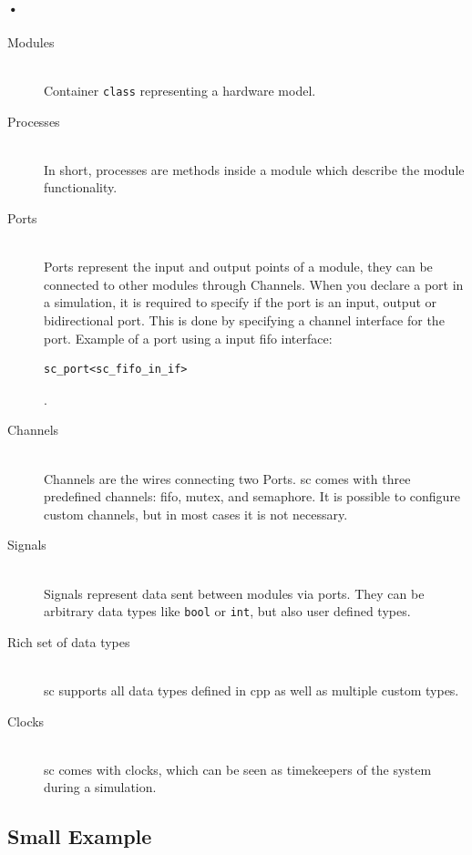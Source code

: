 \documentclass[a4paper, 12pt]{report}
\newcommand{\codeword}[1]{\texttt{#1}}
\begin{document}
\paragraph{•}
\begin{description}
\item[Modules] \hfill \\
Container \codeword{class} representing a hardware model.
\item[Processes] \hfill \\
In short, processes are methods inside a module which describe the module functionality.
\item[Ports] \hfill \\
Ports represent the input and output points of a module, they can be connected to other modules through Channels.
		When you declare a port in a simulation, it is required to specify if the port is an input, output or bidirectional port.
		This is done by specifying a channel interface for the port.
		Example of a port using a input \gls{fifo} interface: \begin{verbatim}sc_port<sc_fifo_in_if>\end{verbatim}.
\item[Channels] \hfill \\
Channels are the wires connecting two Ports.
		\gls{sc} comes with three predefined channels: \gls{fifo}, mutex, and semaphore.
		It is possible to configure custom channels, but in most cases it is not necessary.
\item[Signals] \hfill \\
Signals represent data sent between modules via ports.
		They can be arbitrary data types like \codeword{bool} or \codeword{int}, but also user defined types.
\item[Rich set of data types] \hfill \\
\gls{sc} supports all data types defined in \gls{cpp} as well as multiple custom types.
\item[Clocks] \hfill \\
\gls{sc} comes with clocks, which can be seen as timekeepers of the system during a simulation.
\end{description}

\subsection{Small Example}
\end{document}
